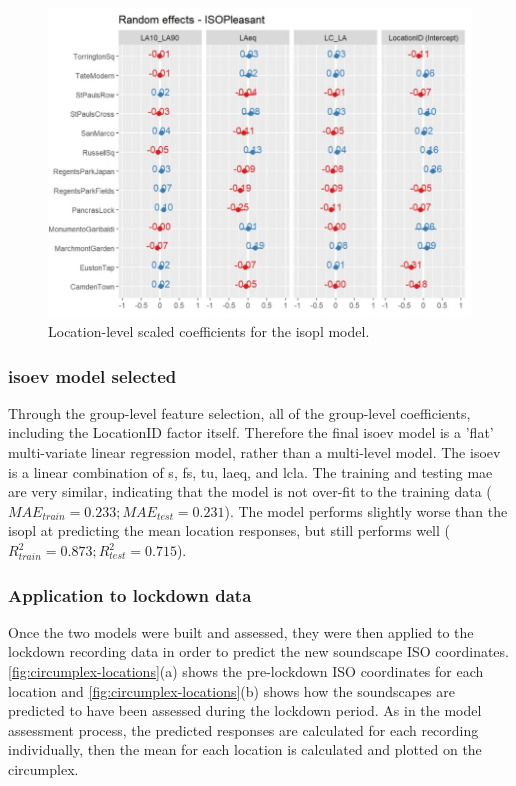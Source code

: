    \begin{figure}[h!]
     \caption{Location-level scaled coefficients for the \gls{isopl} model. \label{fig:pl-slopes}}
     \centering
     \includegraphics[width=\textwidth]{Figures/Lockdown Figure4.jpg}
   \end{figure}

   \subsubsection{\gls{isoev} model selected}

   Through the group-level feature selection, all of the group-level coefficients, including the LocationID factor itself. Therefore the final \gls{isoev} model is a 'flat' multi-variate linear regression model, rather than a multi-level model. The \gls{isoev} is a linear combination of \gls{s}, \gls{fs}, \gls{tu}, \gls{laeq}, and \gls{lcla}. The training and testing \gls{mae} are very similar, indicating that the model is not over-fit to the training data ($MAE_{train}=0.233; MAE_{test}=0.231$). The model performs slightly worse than the \gls{isopl} at predicting the mean location responses, but still performs well ($R^2_{train}=0.873; R^2_{test}=0.715$).

   \subsubsection{Application to lockdown data}
   Once the two models were built and assessed, they were then applied to the lockdown recording data in order to predict the new soundscape ISO coordinates. \cref{fig:circumplex-locations}(a) shows the pre-lockdown ISO coordinates for each location and \cref{fig:circumplex-locations}(b) shows how the soundscapes are predicted to have been assessed during the lockdown period. As in the model assessment process, the predicted responses are calculated for each recording individually, then the mean for each location is calculated and plotted on the circumplex.

